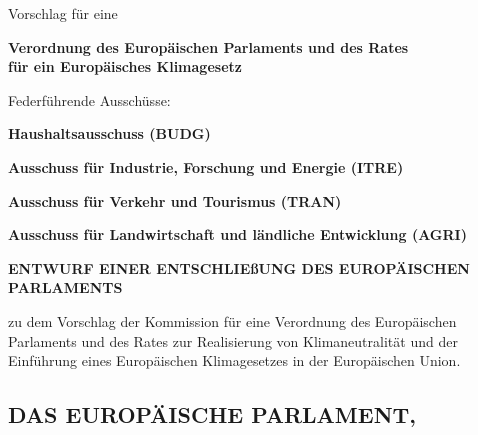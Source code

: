 \documentclass[12pt,a4paper]{article}
\title{}
\author{}
\date{}
\begin{document}
\thispagestyle{empty}

\vspace*{2.5cm}

\begin{center}
\Large
Vorschlag für eine

\vspace{0.8cm}

\textbf{\large Verordnung des Europäischen Parlaments und des Rates\\[0.3em]
für ein Europäisches Klimagesetz}

\vspace{2cm}

\normalsize
Federführende Ausschüsse:

\vspace{0.5cm}

\textbf{Haushaltsausschuss (BUDG)}

\textbf{Ausschuss für Industrie, Forschung und Energie (ITRE)}

\textbf{Ausschuss für Verkehr und Tourismus (TRAN)}

\textbf{Ausschuss für Landwirtschaft und ländliche Entwicklung (AGRI)}
\end{center}


\PlaceLogosOne

\newpage

\begin{center}
\textbf{ENTWURF EINER ENTSCHLIEßUNG DES EUROPÄISCHEN PARLAMENTS}
\end{center}
zu dem Vorschlag der Kommission für eine Verordnung des Europäischen Parlaments und des Rates zur Realisierung von Klimaneutralität und der Einführung eines Europäischen Klimagesetzes in der Europäischen Union.

\vspace{-0.2cm}

\subsection*{DAS EUROPÄISCHE PARLAMENT,}
\end{document}
